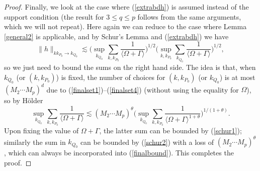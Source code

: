 \documentclass[11 pt,reqno]{amsart}
\theoremstyle{definition}
\theoremstyle{remark}
\numberwithin{equation}{section}
\begin{document}
{\begin{proof}
Finally, we look at the case where (\ref{extrabdh}) is assumed instead of the support condition (the result for $3\leq q\leq p$ follows from the same arguments, which we will not repeat). Here again we can reduce to the case where Lemma \ref{general2} is applicable, and by Schur's Lemma and (\ref{extrabdh}) we have
\[\|h\|_{kk_{P_0}\to k_{Q_0}}\lesssim\bigg(\sup_{k_{Q_0}}\sum_{k,k_{P_0}}\frac{1}{\langle \Omega+\Gamma\rangle}\bigg)^{1/2}\bigg(\sup_{k,k_{P_0}}\sum_{k_{Q_0}}\frac{1}{\langle \Omega+\Gamma\rangle}\bigg)^{1/2},\] so we just need to bound the sums on the right hand side. The idea is that, when $k_{Q_0}$ (or $(k,k_{P_0})$) is fixed, the number of choices for $(k,k_{P_0})$ (or $k_{Q_0}$) is at most $(M_2\cdots M_{p})^d$ due to (\ref{finalset1})--(\ref{finalset4}) (without using the equality for $\Omega$), so by H\"{o}lder
\[\sup_{k_{Q_0}}\sum_{k,k_{P_0}}\frac{1}{\langle \Omega+\Gamma\rangle}\lesssim (M_2\cdots M_{p})^{\theta}\bigg(\sup_{k_{Q_0}}\sum_{k,k_{P_0}}\frac{1}{\langle \Omega+\Gamma\rangle^{1+\theta}}\bigg)^{1/(1+\theta)}.\] Upon fixing the value of $\Omega+\Gamma$, the latter sum can be bounded by (\ref{schur1}); similarly the sum in $k_{Q_0}$ can be bounded by (\ref{schur2}) with a loss of $(M_2\cdots M_{p})^{\theta}$, which can always be incorporated into (\ref{finalbound}). This completes the proof.
\end{proof}
}
\end{document}
